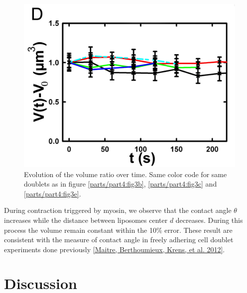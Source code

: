 \documentclass[A4paperpaper,11pt,english]{sphinxmanual}
\begin{document}
\begin{figure}[htbp]
\centering
\capstart

\includegraphics[width=0.500\linewidth]{Fig_03-D.png}
\caption{Evolution of the volume ratio over time.
Same color code for same doublets as in figure \hyperref[parts/part4:fig3b]{ \ref*{parts/part4:fig3b}}, \hyperref[parts/part4:fig3c]{ \ref*{parts/part4:fig3c}}
and \hyperref[parts/part4:fig3e]{ \ref*{parts/part4:fig3e}}.}\label{parts/part4:fig3d}\end{figure}

During contraction triggered by myosin, we observe that the contact angle
\(\theta\) increases while the distance between liposomes center \(d\) decreases.
During this process the volume remain constant within the 10\% error.  These
result are consistent with the measure of contact angle in freely adhering cell
doublet experiments done previously {\hyperref[parts/part4:maitre2012]{{[}Maitre, Berthoumieux, Krens,  et al.  2012{]}}}.


\section{Discussion}
\label{parts/part4:discussion}
\end{document}
